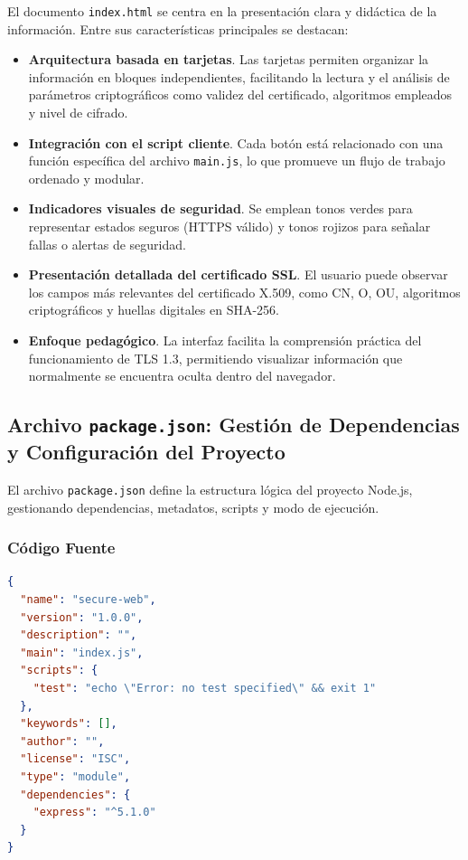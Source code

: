 El documento \texttt{index.html} se centra en la presentación clara y didáctica de la información. Entre sus características principales se destacan:

\begin{itemize}
  \item \textbf{Arquitectura basada en tarjetas}.  
  Las tarjetas permiten organizar la información en bloques independientes, facilitando la lectura y el análisis de parámetros criptográficos como validez del certificado, algoritmos empleados y nivel de cifrado.

  \item \textbf{Integración con el script cliente}.  
  Cada botón está relacionado con una función específica del archivo \texttt{main.js}, lo que promueve un flujo de trabajo ordenado y modular.

  \item \textbf{Indicadores visuales de seguridad}.  
  Se emplean tonos verdes para representar estados seguros (HTTPS válido) y tonos rojizos para señalar fallas o alertas de seguridad.

  \item \textbf{Presentación detallada del certificado SSL}.  
  El usuario puede observar los campos más relevantes del certificado X.509, como CN, O, OU, algoritmos criptográficos y huellas digitales en SHA-256.

  \item \textbf{Enfoque pedagógico}.  
  La interfaz facilita la comprensión práctica del funcionamiento de TLS 1.3, permitiendo visualizar información que normalmente se encuentra oculta dentro del navegador.
\end{itemize}

\subsection{Archivo \texttt{package.json}: Gestión de Dependencias y Configuración del Proyecto}

El archivo \texttt{package.json} define la estructura lógica del proyecto Node.js, gestionando dependencias, metadatos, scripts y modo de ejecución. 

\subsubsection*{Código Fuente}

\begin{lstlisting}[language=JSON, caption={Configuración del proyecto Node.js: package.json}, label={lst:packagejson}]
{
  "name": "secure-web",
  "version": "1.0.0",
  "description": "",
  "main": "index.js",
  "scripts": {
    "test": "echo \"Error: no test specified\" && exit 1"
  },
  "keywords": [],
  "author": "",
  "license": "ISC",
  "type": "module",
  "dependencies": {
    "express": "^5.1.0"
  }
}
\end{lstlisting}

